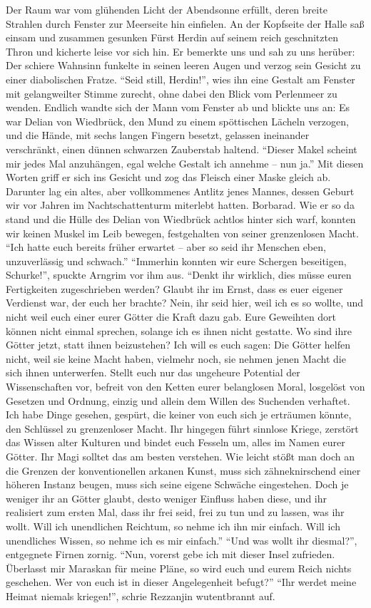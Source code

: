 Der Raum war vom glühenden Licht der Abendsonne erfüllt, deren breite Strahlen durch Fenster zur Meerseite hin einfielen. An der Kopfseite der Halle saß einsam und zusammen gesunken Fürst Herdin auf seinem reich geschnitzten Thron und kicherte leise vor sich hin. Er bemerkte uns und sah zu uns herüber: Der schiere Wahnsinn funkelte in seinen leeren Augen und verzog sein Gesicht zu einer diabolischen Fratze. ``Seid still, Herdin!'', wies ihn eine Gestalt am Fenster mit gelangweilter Stimme zurecht, ohne dabei den Blick vom Perlenmeer zu wenden. Endlich wandte sich der Mann vom Fenster ab und blickte uns an: Es war Delian von Wiedbrück, den Mund zu einem spöttischen Lächeln verzogen, und die Hände, mit sechs langen Fingern besetzt, gelassen ineinander verschränkt, einen dünnen schwarzen Zauberstab haltend. ``Dieser Makel scheint mir jedes Mal anzuhängen, egal welche Gestalt ich annehme -- nun ja.'' Mit diesen Worten griff er sich ins Gesicht und zog das Fleisch einer Maske gleich ab. Darunter lag ein altes, aber vollkommenes Antlitz jenes Mannes, dessen Geburt wir vor Jahren im Nachtschattenturm miterlebt hatten. Borbarad. Wie er so da stand und die Hülle des Delian von Wiedbrück achtlos hinter sich warf, konnten wir keinen Muskel im Leib bewegen, festgehalten von seiner grenzenlosen Macht. ``Ich hatte euch bereits früher erwartet -- aber so seid ihr Menschen eben, unzuverlässig und schwach.'' ``Immerhin konnten wir eure Schergen beseitigen, Schurke!'', spuckte Arngrim vor ihm aus. ``Denkt ihr wirklich, dies müsse euren Fertigkeiten zugeschrieben werden? Glaubt ihr im Ernst, dass es euer eigener Verdienst war, der euch her brachte? Nein, ihr seid hier, weil ich es so wollte, und nicht weil euch einer eurer Götter die Kraft dazu gab. Eure Geweihten dort können nicht einmal sprechen, solange ich es ihnen nicht gestatte. Wo sind ihre Götter jetzt, statt ihnen beizustehen? Ich will es euch sagen: Die Götter helfen nicht, weil sie keine Macht haben, vielmehr noch, sie nehmen jenen Macht die sich ihnen unterwerfen. Stellt euch nur das ungeheure Potential der Wissenschaften vor, befreit von den Ketten eurer belanglosen Moral, losgelöst von Gesetzen und Ordnung, einzig und allein dem Willen des Suchenden verhaftet. Ich habe Dinge gesehen, gespürt, die keiner von euch sich je erträumen könnte, den Schlüssel zu grenzenloser Macht. Ihr hingegen führt sinnlose Kriege, zerstört das Wissen alter Kulturen und bindet euch Fesseln um, alles im Namen eurer Götter. Ihr Magi solltet das am besten verstehen. Wie leicht stößt man doch an die Grenzen der konventionellen arkanen Kunst, muss sich zähneknirschend einer höheren Instanz beugen, muss sich seine eigene Schwäche eingestehen. Doch je weniger ihr an Götter glaubt, desto weniger Einfluss haben diese, und ihr realisiert zum ersten Mal, dass ihr frei seid, frei zu tun und zu lassen, was ihr wollt. Will ich unendlichen Reichtum, so nehme ich ihn mir einfach. Will ich unendliches Wissen, so nehme ich es mir einfach.'' ``Und was wollt ihr diesmal?'', entgegnete Firnen zornig. ``Nun, vorerst gebe ich mit dieser Insel zufrieden. Überlasst mir Maraskan für meine Pläne, so wird euch und eurem Reich nichts geschehen. Wer von euch ist in dieser Angelegenheit befugt?'' ``Ihr werdet meine Heimat niemals kriegen!'', schrie Rezzanjin wutentbrannt auf. 